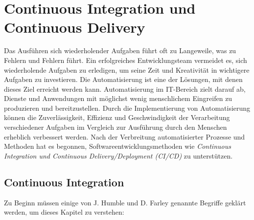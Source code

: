\chapter{Continuous Integration und Continuous Delivery} \label{ch:cicd}

Das Ausführen sich wiederholender Aufgaben führt oft zu Langeweile, was zu Fehlern und Fehlern führt. Ein erfolgreiches Entwicklungsteam vermeidet es, sich wiederholende Aufgaben zu erledigen, um seine Zeit und Kreativität in wichtigere Aufgaben zu investieren. Die Automatisierung ist eine der Lösungen, mit denen dieses Ziel erreicht werden kann. Automatisierung im IT-Bereich zielt darauf ab, Dienste und Anwendungen mit möglichst wenig menschlichem Eingreifen zu produzieren und bereitzustellen. Durch die Implementierung von Automatisierung können die Zuverlässigkeit, Effizienz und Geschwindigkeit der Verarbeitung verschiedener Aufgaben im Vergleich zur Ausführung durch den Menschen erheblich verbessert werden. Nach der Verbreitung automatisierter Prozesse und Methoden hat es begonnen, Softwareentwicklungsmethoden wie \textit{Continuous Integration und Continuous Delivery/Deployment (CI/CD)} zu unterstützen.

\section{Continuous Integration}

Zu Beginn müssen einige von J. Humble und D. Farley \cite{JezHumble2010} genannte Begriffe geklärt werden, um dieses Kapitel zu verstehen:

